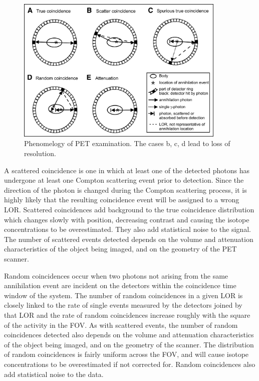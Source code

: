 \begin{figure}  
\centering
\includegraphics[width=10cm]{Pictures/Chapter_1/coinci_PET}
\caption[Coincidencies in PET exam]{Phenomelogy of PET examination. The cases b, c, d lead to loss of resolution.}
\label{fig:coinc}
\end{figure}

A scattered coincidence is one in which at least one of the detected photons has undergone at least one Compton scattering event prior to detection. Since the direction of the photon is changed during the Compton scattering process, it is highly likely that the resulting coincidence event will be assigned to a wrong LOR. Scattered coincidences add background to the true coincidence distribution which changes slowly with position, decreasing contrast and causing the isotope concentrations to be overestimated. They also add statistical noise to the signal. The number of scattered events detected depends on the volume and attenuation characteristics of the object being imaged, and on the geometry of the PET scanner.

Random coincidences occur when two photons not arising from the same annihilation event are incident on the detectors within the coincidence time window of the system. The number of random coincidences in a given LOR is closely linked to the rate of single events measured by the detectors joined by that LOR and the rate of random coincidences increase roughly with the square of the activity in the FOV. As with scattered events, the number of random coincidences detected also depends on the volume and attenuation characteristics of the object being imaged, and on the geometry of the scanner. The distribution of random coincidences is fairly uniform across the FOV, and will cause isotope concentrations to be overestimated if not corrected for. Random coincidences also add statistical noise to the data.

